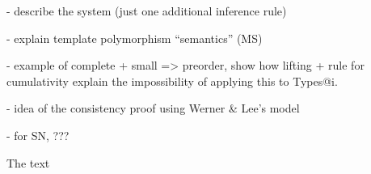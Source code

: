 \documentclass{easychair}
\begin{document}
- describe the system (just one additional inference rule)

- explain template polymorphism ``semantics'' (MS)

- example of complete + small => preorder, show how lifting + rule for
cumulativity explain the impossibility of applying this to Types@{i}.

- idea of the consistency proof using Werner \& Lee's model

- for SN, ???

The text



\end{document}
